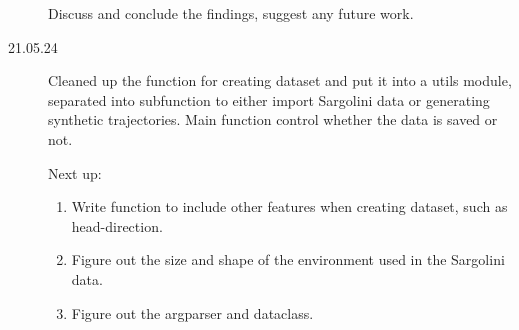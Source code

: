 \begin{description}
    Discuss and conclude the findings, suggest any future work.

    \item[21.05.24] Cleaned up the function for creating dataset and put it into a utils module, separated into subfunction to either import Sargolini data or generating synthetic trajectories. Main function control whether the data is saved or not. 

    Next up:
    \begin{enumerate}
        \item Write function to include other features when creating dataset, such as head-direction.
        \item Figure out the size and shape of the environment used in the Sargolini data.
        \item Figure out the argparser and dataclass.
    \end{enumerate}
\end{description}